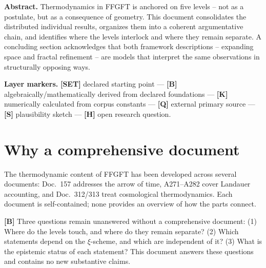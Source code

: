 
\providecommand{\qedsq}{\raisebox{0.03em}{\framebox[0.62em]{\rule{0pt}{0.42em}}}}

\begingroup\small\noindent
\textbf{Abstract.}
Thermodynamics in FFGFT is anchored on five levels --
not as a postulate, but as a consequence of geometry.
This document consolidates the distributed individual results,
organizes them into a coherent argumentative chain, and identifies
where the levels interlock and where they remain separate.
A concluding section acknowledges that both framework descriptions --
expanding space and fractal refinement -- are models that interpret
the same observations in structurally opposing ways.
\par\endgroup

\bigskip

\begingroup\small\noindent
\textbf{Layer markers.}
\textbf{[SET]} declared starting point ---
\textbf{[B]} algebraically/mathematically derived from declared foundations ---
\textbf{[K]} numerically calculated from corpus constants ---
\textbf{[Q]} external primary source ---
\textbf{[S]} plausibility sketch ---
\textbf{[H]} open research question.
\par\endgroup

\bigskip

\section{Why a comprehensive document}

The thermodynamic content of FFGFT has been developed across several
documents: Doc.~157 addresses the arrow of time, A271--A282 cover
Landauer accounting, and Doc.~312/313 treat cosmological thermodynamics.
Each document is self-contained; none provides an overview of how
the parts connect.

\textbf{[B]} Three questions remain unanswered without a comprehensive
document: (1) Where do the levels touch, and where do they remain
separate? (2) Which statements depend on the $\xi$-scheme, and which
are independent of it? (3) What is the epistemic status of each
statement? This document answers these questions and contains no
new substantive claims.

